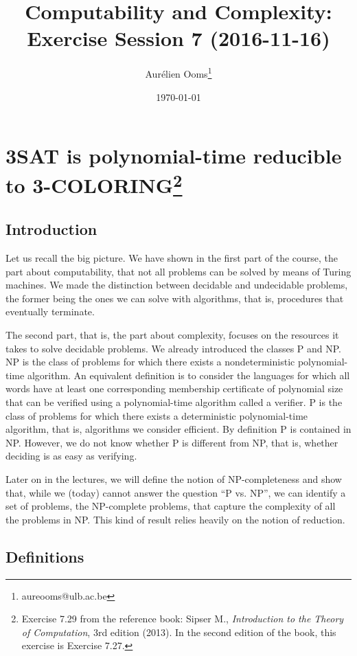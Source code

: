\documentclass{article}
\title{Computability and Complexity:\\Exercise Session 7 (2016-11-16)}
\author{Aurélien Ooms\footnote{aureooms@ulb.ac.be}}
\date{\today}
\begin{document}
\maketitle
\tableofcontents

\section{3SAT is polynomial-time reducible to 3-COLORING\footnote{%
Exercise 7.29 from the reference book: Sipser M.,
\emph{Introduction to the Theory of Computation}, 3rd edition (2013).
In the second edition of the book, this exercise is Exercise 7.27.}}

\subsection{Introduction}

Let us recall the big picture. We have shown in the first part of the course,
the part about computability, that not all problems can be solved by means of
Turing machines. We made the distinction between decidable and undecidable
problems, the former being the ones we can solve with algorithms, that is,
procedures that eventually terminate.

The second part, that is, the part about complexity, focuses on the resources
it takes to solve decidable problems. We already introduced the classes P and
NP. NP is the class of problems for which there exists a nondeterministic
polynomial-time algorithm. An equivalent definition is to consider the
languages for which all words have at least one corresponding membership
certificate of polynomial size that can be verified using a polynomial-time
algorithm called a verifier. P is the class of problems for which there exists
a deterministic polynomial-time algorithm, that is, algorithms we consider
efficient. By definition P is contained in NP.
However, we do not know whether P is different from NP, that is, whether
deciding is as easy as verifying.

Later on in the lectures, we will define the notion of NP-completeness and show
that, while we (today) cannot answer the question ``P vs. NP'', we can identify
a set of problems, the NP-complete problems, that capture the complexity of all
the problems in NP. This kind of result relies heavily on the notion of
reduction.

\subsection{Definitions}
\end{document}
